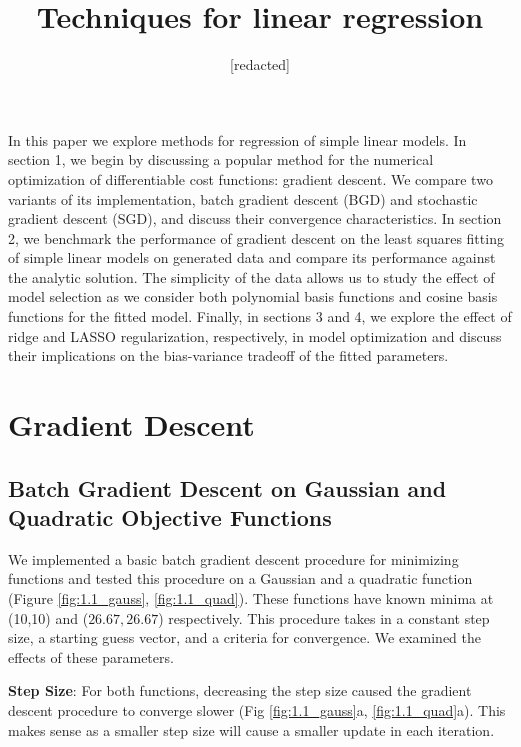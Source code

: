 \documentclass[10pt, twocolumn]{article}
\begin{document}
 
\title{Techniques for linear regression}
\author{[redacted]}
\maketitle
 
In this paper we explore methods for regression of simple linear models. In section 1, we begin by discussing a popular method for the numerical optimization of differentiable cost functions: gradient descent. We compare two variants of its implementation, batch gradient descent (BGD) and stochastic gradient descent (SGD), and discuss their convergence characteristics. In section 2, we benchmark the performance of gradient descent on the least squares fitting of simple linear models on generated data and compare its performance against the analytic solution. The simplicity of the data allows us to study the effect of model selection as we consider both polynomial basis functions and cosine basis functions for the fitted model. Finally, in sections 3 and 4, we explore the effect of ridge and LASSO regularization, respectively, in model optimization and discuss their implications on the bias-variance tradeoff of the fitted parameters.

\section{Gradient Descent}

\subsection{Batch Gradient Descent on Gaussian and Quadratic Objective Functions}

We implemented a basic batch gradient descent procedure for minimizing functions and tested this procedure on a Gaussian and a quadratic function (Figure \ref{fig:1.1_gauss}, \ref{fig:1.1_quad}). These functions have known minima at (10,10) and ($26.67,26.67$) respectively. This procedure takes in a constant step size, a starting guess vector, and a criteria for convergence. We examined the effects of these parameters.
 

 \textbf{Step Size}: For both functions, decreasing the step size caused the gradient descent procedure to converge slower (Fig \ref{fig:1.1_gauss}a, \ref{fig:1.1_quad}a). This makes sense as a smaller step size will cause a smaller update in each iteration. 
 
\end{document}
